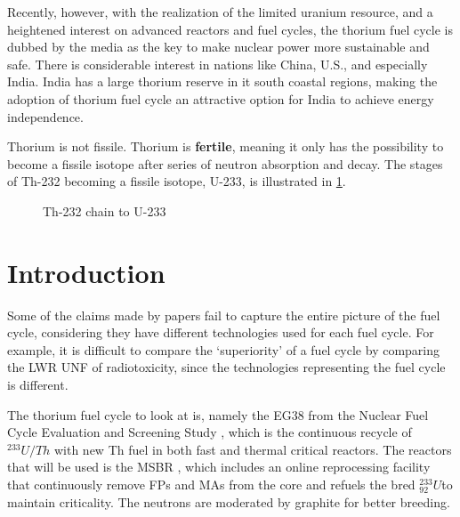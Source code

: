 \documentclass{article}
\makeatletter
\def\tikzscale{1}\begin{lrbox}{\measure@tikzpicture}%
\edef\tikzscale{\pgfmathresult}%
\newcommand{\uthree}{$^{233}_{92}U$}
\makeatother
\begin{document}
Recently, however, with the realization of the limited
uranium resource, and a heightened interest on advanced
reactors and fuel cycles, the thorium fuel cycle is
dubbed by the media as the key to make nuclear power
more sustainable and safe. There is considerable interest
in nations like China, U.S., and especially India.
India has a large thorium reserve in it south coastal regions,
making the adoption of thorium fuel cycle an attractive option
for India to achieve energy independence.

Thorium is not fissile. Thorium is \textbf{fertile}, meaning
it only has the possibility to become a fissile isotope after
series of neutron absorption and decay. The stages of Th-232
becoming a fissile isotope, U-233, is illustrated in \cref{diag:th_chain}. 

\begin{figure}[h]
\caption{Th-232 chain to U-233}
\label{diag:th_chain}
\begin{scaletikzpicturetowidth}{\textwidth}
\end{scaletikzpicturetowidth}
\end{figure}


\section{Introduction}


Some of the claims made by papers fail to capture
the entire picture of the fuel cycle, considering they have different
technologies used for each fuel cycle. For example, it is difficult
to compare the `superiority' of a fuel cycle by comparing the 
\gls{LWR} \gls{UNF} of radiotoxicity, since the technologies
representing the fuel cycle is different.

The thorium fuel cycle to look at is, namely the EG38
from the Nuclear Fuel Cycle Evaluation and Screening Study \cite{wigeland_nuclear_2014},
which is the continuous recycle of $^{233}U/Th$ with new
Th fuel in both fast and thermal critical reactors.
The reactors that will be used is the \gls{MSBR} \cite{robertson_conceptual_1971},
which includes an online reprocessing facility that
continuously remove \glspl{FP} and \glspl{MA} from the core
and refuels the bred \uthree to maintain criticality. 
The neutrons are moderated by graphite for better breeding.
\end{document}
